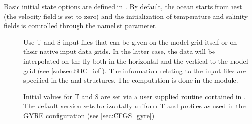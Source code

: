 \documentclass[../main/NEMO_manual]{subfiles}
\begin{document}
\begin{listing}
  \caption{}
  \label{lst:namtsd}
\end{listing}

Basic initial state options are defined in .
By default, the ocean starts from rest (the velocity field is set to zero) and
the initialization of temperature and salinity fields is controlled through the  namelist parameter.

\begin{description}
\item [{}] Use T and S input files that can be given on
  the model grid itself or on their native input data grids.
  In the latter case,
  the data will be interpolated on-the-fly both in the horizontal and the vertical to the model grid
  (see \autoref{subsec:SBC_iof}).
  The information relating to the input files are specified in
  the  and  structures.
  The computation is done in the  module.
\item [{}] Initial values for T and S are set via
  a user supplied  routine contained in .
  The default version sets horizontally uniform T and profiles as used in the GYRE configuration
  (see \autoref{sec:CFGS_gyre}).
\end{description}

\subinc{}
\end{document}
